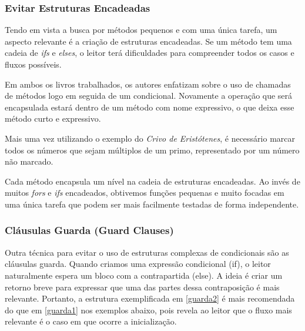 

\subsubsection{Evitar Estruturas Encadeadas}
Tendo em vista a busca por métodos pequenos e com uma única tarefa, um aspecto relevante é a criação de estruturas encadeadas. Se um método tem uma cadeia de \textit{ifs} e \textit{elses}, o leitor terá dificuldades para compreender todos os casos e fluxos possíveis.
	
Em ambos os livros trabalhados, os autores enfatizam sobre o uso de chamadas de métodos logo em seguida de um condicional. Novamente a operação que será encapsulada estará dentro de um método com nome expressivo, o que deixa esse método curto e expressivo.
	
Mais uma vez utilizando o exemplo do \textit{Crivo de Eristótenes}, é necessário marcar todos os números que sejam múltiplos de um primo, representado por um número não marcado.



Cada método encapsula um nível na cadeia de estruturas encadeadas. Ao invés de muitos \textit{fors} e \textit{ifs} encadeados, obtivemos funções pequenas e muito focadas em uma única tarefa que podem ser mais facilmente testadas de forma independente.

\subsubsection{Cláusulas Guarda (Guard Clauses)}
Outra técnica para evitar o uso de estruturas complexas de condicionais são as cláusulas guarda. Quando criamos uma expressão condicional (if), o leitor naturalmente espera um bloco com a contrapartida (else). A ideia é criar um retorno breve para expressar que uma das partes dessa contraposição é mais relevante. Portanto, a estrutura exemplificada em \ref{guarda2} é mais recomendada do que em \ref{guarda1} nos exemplos abaixo, pois revela ao leitor que o fluxo mais relevante é o caso em que ocorre a inicialização.




